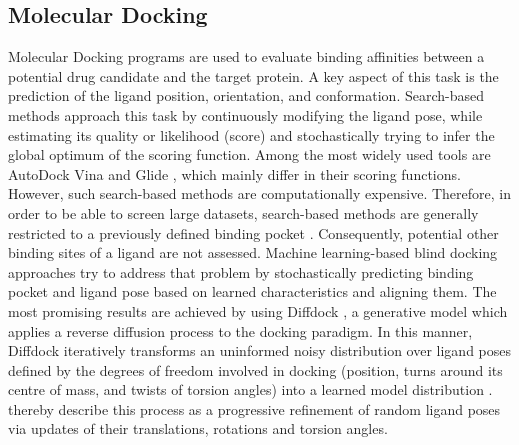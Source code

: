 \documentclass[11pt, letterpaper, titlepage]{article}
\renewcommand{\cite}{\parencite}
\begin{document}
\subsection{Molecular Docking}
Molecular Docking programs are used to evaluate binding affinities between a potential drug candidate and the target protein. A key aspect of this task is the prediction of the ligand position, orientation, and conformation. Search-based methods approach this task by continuously modifying the ligand pose, while estimating its quality or likelihood (score) and stochastically trying to infer the global optimum of the scoring function. Among the most widely used tools are AutoDock Vina \cite{Trott.2010} and Glide \cite{Halgren.2004}, which mainly differ in their scoring functions. However, such search-based methods are computationally expensive. Therefore, in order to be able to screen large datasets, search-based methods are generally restricted to a previously defined binding pocket \cite{Corso.2022}. Consequently, potential other binding sites of a ligand are not assessed. Machine learning-based blind docking approaches try to address that problem by stochastically predicting binding pocket and ligand pose based on learned characteristics and aligning them. The most promising results are achieved by using Diffdock \cite{Corso.2022}, a generative model which applies a reverse diffusion process to the docking paradigm. In this manner, Diffdock iteratively transforms an uninformed noisy distribution over ligand poses defined by the degrees of freedom involved in docking (position, turns around its centre of mass, and twists of torsion angles) into a learned model distribution \cite{Corso.2022}. \textcite{Corso.2022} thereby describe this process as a progressive refinement of random ligand poses via updates of their translations, rotations and torsion angles.

\end{document}
